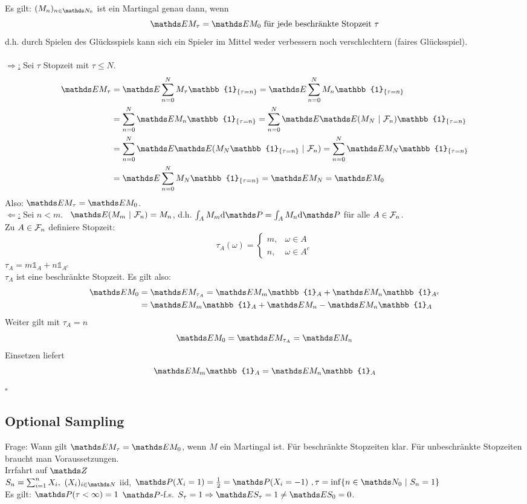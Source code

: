 Es gilt: $(M_n)_{n\in \N_0}$ ist ein Martingal genau dann, wenn 
\[
\E M_{\tau}=\E M_0 \text{ für jede beschränkte Stopzeit }\tau 
\]
d.h. durch Spielen des Glücksspiels kann sich ein Spieler im Mittel weder verbessern noch verschlechtern (faires Glücksspiel).\\

\\
\uline{$\Rightarrow$:} 
Sei $\tau$ Stopzeit mit $\tau\le N$.
\begin{equation*}
\begin{aligned}
	\E M_\tau &=\E \sum_{n=0}^{N}M_\tau \mathbb{1}_{\{\tau=n\}}= \E \sum_{n=0}^{N}M_n \mathbb{1}_{\{\tau=n\}}\\ 
	&=\sum_{n=0}^{N}\E M_n \mathbb{1}_{\{\tau=n\}}= \sum_{n=0}^{N}\E\E(M_N~|~\F_n) \mathbb{1}_{\{\tau=n\}}\\
	&= \sum_{n=0}^{N}\E\E(M_N\mathbb{1}_{\{\tau=n\}}~|~\F_n)= \sum_{n=0}^{N}\E M_N\mathbb{1}_{\{\tau=n\}}\\
	&=\E\sum_{n=0}^{N}M_N \mathbb{1}_{\{\tau=n\}}= \E M_N= \E M_0
\end{aligned}
\end{equation*}
Also: $\E M_\tau=\E M_0$.\\

\uline{$\Leftarrow$:} 
Sei $n<m$. 
\zz~$\E(M_m~|~\F_n)=M_n$, d.h. $\int_A M_m\dint \Pw = \int_A M_n\dint\Pw$ für alle $A\in \mathcal{F}_n$.\\
Zu $A\in \mathcal{F}_n$ definiere Stopzeit:
\[
\tau_A(\omega)=\left\{\begin{array}{cl}  m, & \omega\in A\\ n, & \omega \in A^c   \end{array}\right. 
\]
$\tau_A=m\mathbb{1}_A+n\mathbb{1}_{A^c}$\\
$\tau_A$ ist eine beschränkte Stopzeit. 
Es gilt also:
\begin{equation*}
\begin{aligned}
	\E M_0 &=\E M_{\tau_A}= \E M_m\mathbb{1}_A+ \E M_n \mathbb{1}_{A^c}\\
	&= \E  M_m\mathbb{1}_A+ \E M_n- \E M_n \mathbb{1}_{A}
\end{aligned}
\end{equation*}
Weiter gilt mit $\tau_A = n$ 
\[
\E M_0=\E M_{\tau_A} =\E M_n 
\]
Einsetzen  liefert 
\[
\E M_m\mathbb{1}_A=\E M_n\mathbb{1}_A 
\]
\hfill $\square$

\subsection{Optional Sampling}
\label{sub:opt_sampling}
Frage: Wann gilt $\E M_\tau=\E M_0$, wenn $M$ ein Martingal ist. 
Für beschränkte Stopzeiten klar. 
Für unbeschränkte Stopzeiten braucht man Voraussetzungen.\\
 Irrfahrt auf $\Z$\\
$S_n=\sum_{i=1}^{n}X_i,~ (X_i)_{i\in \N}$ iid, $\Pw(X_i=1)=\frac{1}{2}=\Pw(X_i=-1)~, \tau=\inf\{n\in \N_0~|~S_n=1\}$\\
Es gilt: $\Pw(\tau<\infty)=1$ $\Pw$-f.s. $S_\tau=1\Rightarrow \E S_\tau=1\not=\E S_0=0$.

